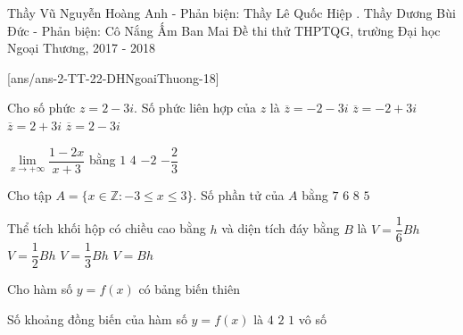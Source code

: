 \begin{name}
{Thầy Vũ Nguyễn Hoàng Anh - Phản biện: Thầy Lê Quốc Hiệp . Thầy Dương Bùi Đức - Phản biện: Cô Nắng Ấm Ban Mai}
{Đề thi thử THPTQG, trường Đại học Ngoại Thương, 2017 - 2018}
\end{name}
[ans/ans-2-TT-22-DHNgoaiThuong-18]

\begin{ex}%
Cho số phức $z=2-3i$. Số phức liên hợp của $z$ là
\choice
{$\overline{z}=-2-3i$}
{$\overline{z}=-2+3i$}
{\True $\overline{z}=2+3i$}
{$\overline{z}=2-3i$}
\end{ex}

\begin{ex}%
$\lim\limits_{x\to +\infty}\dfrac{1-2x}{x+3}$ bằng
\choice
{$1$}
{$4$}
{\True $-2$}
{$-\dfrac{2}{3}$}
\end{ex}

\begin{ex}%
Cho tập $A=\{x\in \mathbb{Z}: -3\le x\le 3\}$. Số phần tử của $A$ bằng
\choice
{\True $7$}
{$6$}
{$8$}
{$5$}
\end{ex}

\begin{ex}%
Thể tích khối hộp có chiều cao bằng $h$ và diện tích đáy bằng $B$ là
\choice
{$V=\dfrac{1}{6}Bh$}
{$V=\dfrac{1}{2}Bh$}
{$V=\dfrac{1}{3}Bh$}
{\True $V=Bh$}
\end{ex}

\begin{ex}%
Cho hàm số $y=f(x)$ có bảng biến thiên
\begin{center}
\end{center}
Số khoảng đồng biến của hàm số $y=f(x)$ là
\choice
{$4$}
{$2$}
{$1$}
{\True vô số}
\end{ex}

